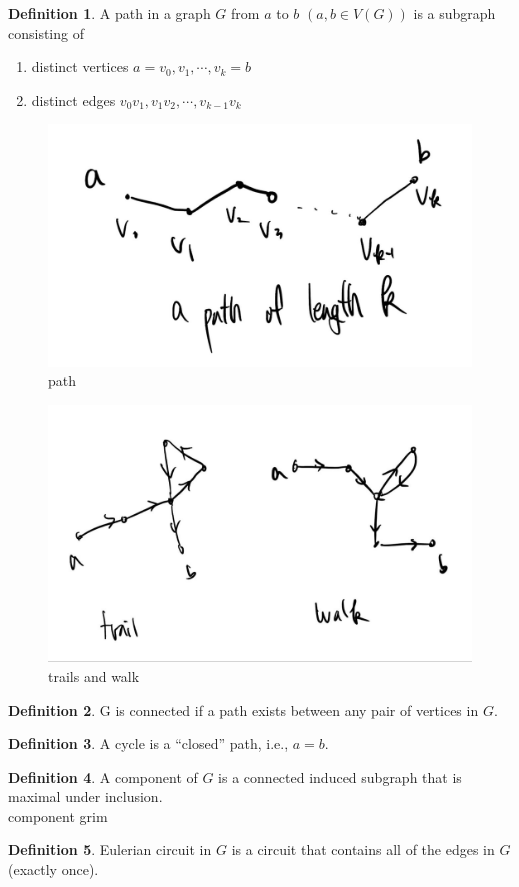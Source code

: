 \documentclass{article}
\theoremstyle{definition}
\newtheorem{defn}{Definition}[]
\begin{document}
\begin{defn}
    A path in a graph $G$ from $a$ to $b$ $(a, b \in V(G))$ is a subgraph 
    consisting of 
    \begin{enumerate}
        \item distinct vertices $a = v_0, v_1, \cdots, v_k = b$
        \item distinct edges $v_0 v_1, v_1 v_2, \cdots, v_{k-1} v_k $
    \end{enumerate}
    \begin{figure}[!h]
        \centerline{\includegraphics[width=0.5\columnwidth]{path.jpg}}
        \caption{path}
        \label{path} 
    \end{figure}
    \begin{figure}[!h]
        \centerline{\includegraphics[width=0.5\columnwidth]{trail_walk.jpg}}
        \caption{trails and walk}
        \label{tw} 
    \end{figure}
\end{defn}
\begin{defn}
    G is connected if a path exists between any pair of vertices in $G$. 
\end{defn}
\begin{defn}
    A cycle is a ``closed'' path, i.e., $a=b$.
\end{defn}
\begin{defn}
    A component of $G$ is a connected induced subgraph that is maximal 
    under inclusion. \\ 
    component grim
\end{defn}
\begin{defn}
    Eulerian circuit in $G$ is a circuit that contains all of the edges in $G$
    (exactly once).
\end{defn}
\end{document}
